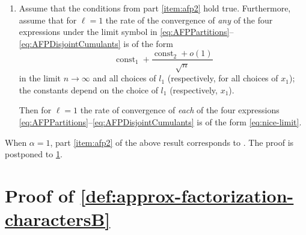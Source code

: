 \documentclass[12pt,usenames,dvipsnames,svgnames,table]{amsart}
\begin{document}
\begin{theorem}
\begin{enumerate}[label=(\emph{\alph*})]
		
		
		
		\item 
		\label{item:equivalent-enhanced}
		Assume that the conditions from part  \ref{item:afp2}
		hold true.
		Furthermore, assume that for $\ell=1$ the rate of the convergence of
		\emph{any} of the four expressions under the limit symbol in
		\eqref{eq:AFPPartitions}--\eqref{eq:AFPDisjointCumulants} 
		is of the form 
		\begin{equation}
		\label{eq:nice-limit}
		\operatorname{const}_1+ \frac{\operatorname{const}_2+o(1)}{\sqrt{n}}    
		\end{equation}
		in the limit $n \to \infty$
		and all choices of $l_1$ (respectively, for all choices of $x_1$);
		the constants depend on the choice of $l_1$ (respectively, $x_1$).
		
		Then for $\ell=1$ the rate of convergence of \emph{each} of the four expressions
		\eqref{eq:AFPPartitions}--\eqref{eq:AFPDisjointCumulants} 
		is of the form \eqref{eq:nice-limit}.
	\end{enumerate}
	
	
\end{theorem}

When $\alpha=1$, part \ref{item:afp2} of the above result corresponds to \cite[Theorem and Definition 1]{Sniady2006c}. 
The proof is postponed to \cref{sec:proof-of-key-tool-short}.

\section{Proof of \cref{def:approx-factorization-charactersB}}
\label{sec:proof-of-key-tool-short}
\end{document}
